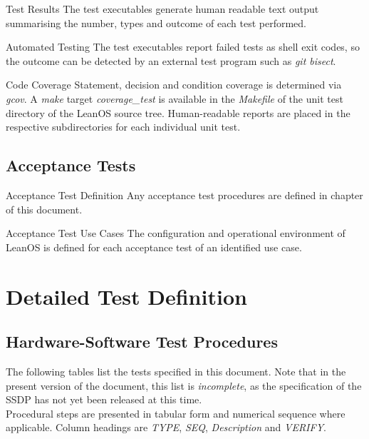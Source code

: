 {Test Results}{%
The test executables generate human readable text output summarising the number,
types and outcome of each test performed.
}%
{}{}


{\hspace{0pt} Automated Testing}{%
The test executables report failed tests as shell exit codes, so the outcome
can be detected by an external test program such as \emph{git bisect}.
}%
{}{}


{Code Coverage}{%
Statement, decision and condition coverage is determined via \emph{gcov}.
A \emph{make} target \emph{coverage\_test} is available in the \emph{Makefile}
of the unit test directory of the LeanOS source tree.
Human-readable reports are placed in the respective subdirectories for each
individual unit test.
}%
{}{}


\section{Acceptance Tests}

{\hspace{0pt} Acceptance Test Definition}{%
Any acceptance test procedures are defined in chapter
\mbox{} of this document.
}%
{}{}

{\hspace{0pt} Acceptance Test Use Cases}{%
The configuration and operational environment of LeanOS is defined for each
acceptance test of an identified use case.
}%
{}{}


\chapter{Detailed Test Definition}
\label{detailedtestdefinitions}

\section{Hardware-Software Test Procedures}
The following tables list the tests specified in this document. Note that in
the present version of the document, this list is \emph{incomplete}, as the
specification of the \gls{SSDP} has not yet been released at this time.\\

\noindent
Procedural steps are presented in tabular form and numerical sequence where
applicable. Column headings are \emph{TYPE}, \emph{SEQ}, \emph{Description}
and \emph{VERIFY}.\\

